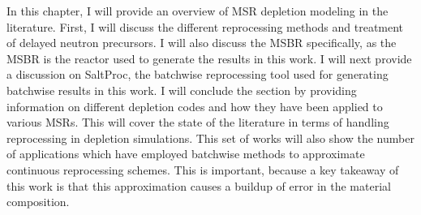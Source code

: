 \renewcommand*\descriptionlabel[1]{\hspace\leftmargin$#1$}
\setcounter{tocdepth}{5}
\setcounter{secnumdepth}{5}

In this chapter, I will provide an overview of MSR depletion modeling in the literature. First, I will discuss the different reprocessing methods and treatment of delayed neutron precursors. I will also discuss the MSBR specifically, as the MSBR is the reactor used to generate the results in this work.
I will next provide a discussion on SaltProc, the batchwise reprocessing tool used for generating batchwise results in this work.
I will conclude the section by providing information on different depletion codes and how they have been applied to various MSRs. This will cover the state of the literature in terms of handling reprocessing in depletion simulations. This set of works will also show the number of applications which have employed batchwise methods to approximate continuous reprocessing schemes. This is important, because a key takeaway of this work is that this approximation causes a buildup of error in the material composition.



